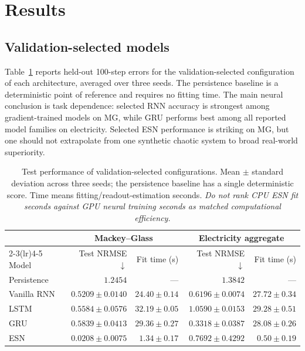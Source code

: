 \documentclass[final,5p,times,twocolumn]{elsarticle}
\begin{document}
\section{Results}

\subsection{Validation-selected models}
Table~\ref{tab:results} reports held-out 100-step errors for the validation-selected configuration of each architecture, averaged over three seeds. The persistence baseline is a deterministic point of reference and requires no fitting time. The main neural conclusion is task dependence: selected RNN accuracy is strongest among gradient-trained models on MG, while GRU performs best among all reported model families on electricity. Selected ESN performance is striking on MG, but one should not extrapolate from one synthetic chaotic system to broad real-world superiority.

\begin{table}[t]
\caption{Test performance of validation-selected configurations. Mean $\pm$ standard deviation across three seeds; the persistence baseline has a single deterministic score. Time means fitting/readout-estimation seconds. \emph{Do not rank CPU ESN fit seconds against GPU neural training seconds as matched computational efficiency.}}
\label{tab:results}
\centering
\small
\setlength{\tabcolsep}{7pt}
\begin{tabular}{lrrrr}
\toprule
& \multicolumn{2}{c}{Mackey--Glass} & \multicolumn{2}{c}{Electricity aggregate} \\
\cmidrule(lr){2-3}\cmidrule(lr){4-5}
Model & Test NRMSE $\downarrow$ & Fit time (s) & Test NRMSE $\downarrow$ & Fit time (s) \\
\midrule
Persistence & $1.2454$ & --- & $1.3842$ & --- \\
Vanilla RNN & $0.5209\pm0.0140$ & $24.40\pm0.14$ & $0.6196\pm0.0074$ & $27.72\pm0.34$ \\
LSTM & $0.5584\pm0.0576$ & $32.19\pm0.05$ & $1.0590\pm0.0153$ & $29.28\pm0.51$ \\
GRU & $0.5839\pm0.0413$ & $29.36\pm0.27$ & $\mathbf{0.3318\pm0.0387}$ & $28.08\pm0.26$ \\
ESN & $\mathbf{0.0208\pm0.0075}$ & $1.34\pm0.17$ & $0.7692\pm0.4292$ & $0.50\pm0.19$ \\
\bottomrule
\end{tabular}
\end{table}
\end{document}
